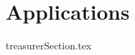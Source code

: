 \documentclass[class=report , crop=false, openany, titlepage, twoside, multi={itemize, figure, verbatim}, float=false]{standalone}
\title{}  %
\begin{document}
\ifstandalone
\maketitle %
\clearpage
\tableofcontents %
\clearpage
\fi

\chapter{Applications}
{treasurerSection.tex}
\clearpage
\end{document}
